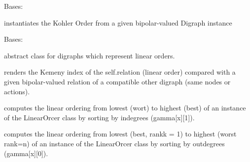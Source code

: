 \documentclass[letterpaper,10pt,english]{sphinxmanual}
\begin{document}

\begin{fulllineitems}
\label{techDoc:linearOrders.KohlerOrder}
Bases: {\hyperref[techDoc:linearOrders.LinearOrder]{\emph{}}}

instantiates the Kohler Order from
a given bipolar-valued Digraph instance

\end{fulllineitems}


\begin{fulllineitems}
\label{techDoc:linearOrders.LinearOrder}
Bases: {\hyperref[techDoc:digraphs.Digraph]{\emph{}}}

abstract class for digraphs which represent
linear orders.

\begin{fulllineitems}
\label{techDoc:linearOrders.LinearOrder.computeKemenyIndex}
renders the Kemeny index of the self.relation (linear order)
compared with a given bipolar-valued relation of a compatible
other digraph (same nodes or actions).

\end{fulllineitems}


\begin{fulllineitems}
\label{techDoc:linearOrders.LinearOrder.computeOrder}
computes the linear ordering from lowest (wort) to highest (best)
of an instance of the LinearOrcer class by sorting by indegrees (gamma{[}x{]}{[}1{]}).

\end{fulllineitems}


\begin{fulllineitems}
\label{techDoc:linearOrders.LinearOrder.computeRanking}
computes the linear ordering from lowest (best, rankk = 1) to highest (worst rank=n)
of an instance of the LinearOrcer class by sorting by outdegrees (gamma{[}x{]}{[}0{]}).


\end{fulllineitems}
\end{fulllineitems}
\end{document}
